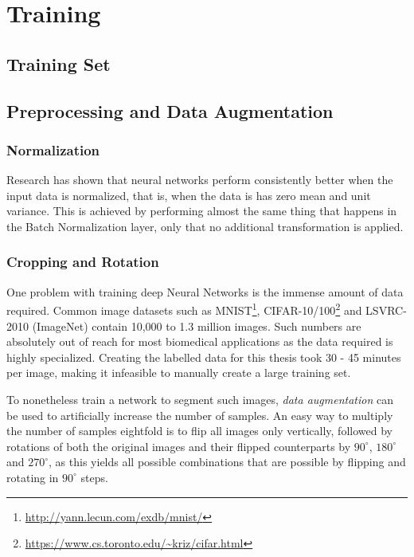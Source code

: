 \chapter{Training}

	\section{Training Set}

	\section {Preprocessing and Data Augmentation}




		\subsection{Normalization}
Research \cite{lecun_norm} has shown that neural networks perform consistently better when the input data is normalized, that is, when the data is has zero mean and unit variance. This is achieved by performing almost the same thing that happens in the Batch Normalization layer, only that no additional transformation is applied.

		\subsection{Cropping and Rotation}
One problem with training deep Neural Networks is the immense amount of data required. Common image datasets such as MNIST\footnote{\url{http://yann.lecun.com/exdb/mnist/}}, CIFAR-10/100\footnote{\url{https://www.cs.toronto.edu/~kriz/cifar.html}} and LSVRC-2010 (ImageNet)\cite{ILSVRC} contain 10,000 to 1.3 million images. Such numbers are absolutely out of reach for most biomedical applications as the data required is highly specialized. Creating the labelled data for this thesis took 30 - 45 minutes per image, making it infeasible to manually create a large training set.

To nonetheless train a network to segment such images, \textit{data augmentation} can be used to artificially increase the number of samples. An easy way to multiply the number of samples eightfold is to flip all images only vertically, followed by rotations of both the original images and their flipped counterparts by $90^{\circ}$, $180^{\circ}$ and $270^{\circ}$, as this yields all possible combinations that are possible by flipping and rotating in $90^{\circ}$ steps.

